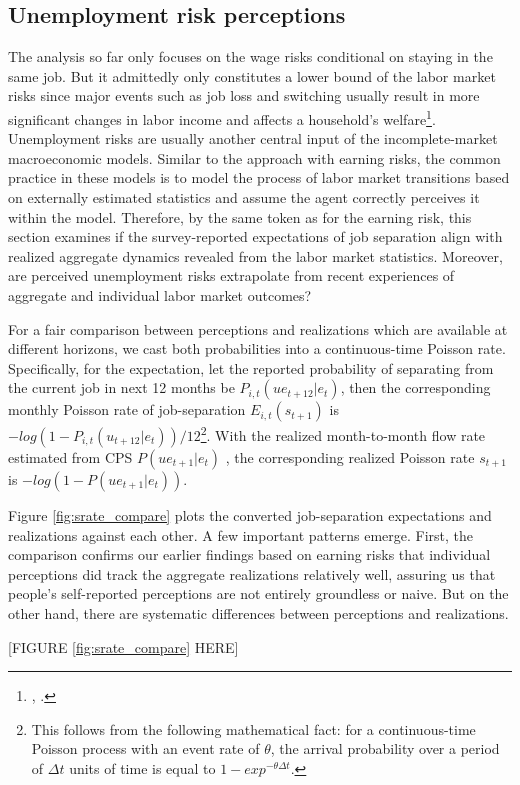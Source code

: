 \hypertarget{unemployment-risk-perceptions}{%
\subsection{Unemployment risk perceptions}\label{unemployment-risk-perceptions}}

The analysis so far only focuses on the wage risks conditional on staying in the same job. But it admittedly only constitutes a lower bound of the labor market risks since major events such as job loss and switching usually result in more significant changes in labor income and affects a household's welfare\footnote{\cite{low2010wage}, \cite{davis2011recessions}.}. Unemployment risks are usually another central input of the incomplete-market macroeconomic models. Similar to the approach with earning risks, the common practice in these models is to model the process of labor market transitions based on externally estimated statistics and assume the agent correctly perceives it within the model. Therefore, by the same token as for the earning risk, this section examines if the survey-reported expectations of job separation align with realized aggregate dynamics revealed from the labor market statistics. Moreover, are perceived unemployment risks extrapolate from recent experiences of aggregate and individual labor market outcomes?


For a fair comparison between perceptions and realizations which are available at different horizons, we cast both probabilities into a continuous-time Poisson rate. Specifically, for the expectation, let the reported probability of separating from the current job in next 12 months be $P_{i,t}(ue_{t+12}|e_t)$, then the corresponding monthly Poisson rate of job-separation $E_{i,t}(s_{t+1})$ is $- log(1-P_{i,t}(u_{t+12}|e_t))/12$\footnote{This follows from the following mathematical fact: for a continuous-time Poisson process with an event rate of $\theta$, the arrival probability over a period of $\Delta t$ units of time is equal to $1-exp^{-\theta \Delta t}$.}. With the realized month-to-month flow rate estimated from CPS $P(ue_{t+1}|e_t)$ , the corresponding realized Poisson rate  $s_{t+1}$ is $-log(1-P(ue_{t+1}|e_t))$. 


Figure \ref{fig:srate_compare} plots the converted job-separation expectations and realizations against each other. A few important patterns emerge. First, the comparison confirms our earlier findings based on earning risks that individual perceptions did track the aggregate realizations relatively well, assuring us that people's self-reported perceptions are not entirely groundless or naive. But on the other hand, there are systematic differences between perceptions and realizations. 

\begin{center}
[FIGURE \ref{fig:srate_compare} HERE]
\end{center}



